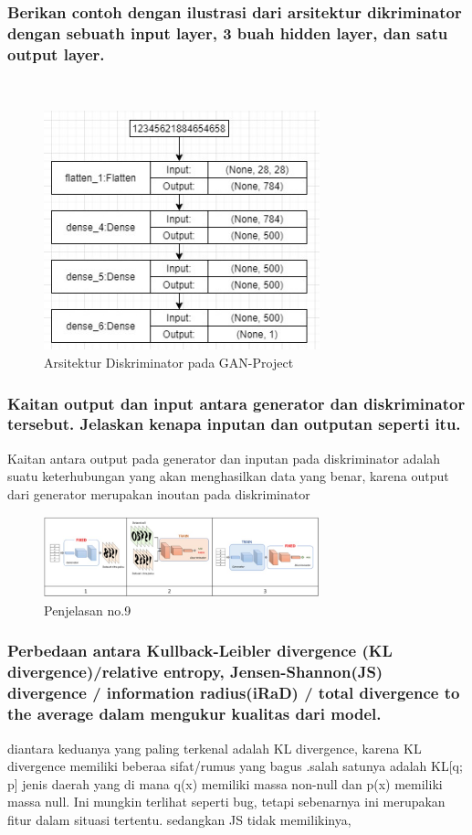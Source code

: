 \subsubsection{Berikan contoh dengan ilustrasi dari arsitektur dikriminator dengan sebuath input layer, 3 buah hidden layer, dan satu output layer.}
\hfill\\
\begin{figure}[H]
	\centering
	\includegraphics[width=8cm]{figures/1174066/8/4a.jpg}
	\caption{Arsitektur Diskriminator pada GAN-Project}
\end{figure}



\subsubsection{Kaitan output dan input antara generator dan diskriminator tersebut. Jelaskan kenapa inputan dan outputan seperti itu.}
\hfill\break
Kaitan antara output pada generator dan inputan pada diskriminator adalah suatu keterhubungan yang akan menghasilkan data yang benar, karena output dari generator merupakan inoutan pada diskriminator
\begin{figure}[H]
	\centering
	\includegraphics[width=8cm]{figures/1174066/8/9.jpg}
	\caption{Penjelasan no.9}
\end{figure}

\subsubsection{Perbedaan antara Kullback-Leibler divergence (KL divergence)/relative entropy, Jensen-Shannon(JS) divergence / information radius(iRaD) / total divergence to the average dalam mengukur kualitas dari model.}
\hfill\break
diantara keduanya yang paling terkenal adalah KL divergence, karena KL divergence memiliki beberaa sifat/rumus yang bagus .salah satunya adalah KL[q; p] jenis daerah yang di mana q(x) memiliki massa non-null dan p(x) memiliki massa null. Ini mungkin terlihat seperti bug, tetapi sebenarnya ini merupakan fitur dalam situasi tertentu. sedangkan JS tidak memilikinya,

